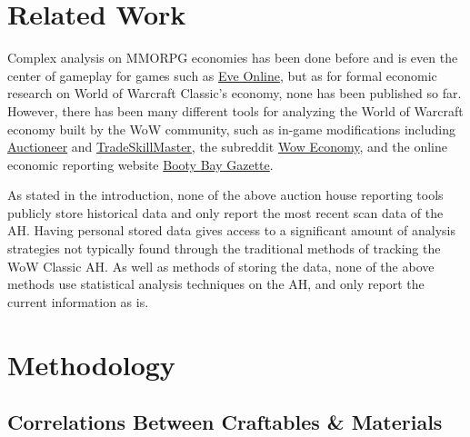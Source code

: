 \documentclass[sigconf]{acmart}
\begin{document}
\section{Related Work}Complex analysis on MMORPG economies has been done before and is even the center of gameplay for games such as \href{https://www.eveonline.com/article/prg4uv/monthly-economic-report-april-2019}{Eve Online}, but as for formal economic research on World of Warcraft Classic’s economy, none has been published so far. However, there has been many different tools for analyzing the World of Warcraft economy built by the WoW community, such as in-game modifications including \href{https://www.curseforge.com/wow/addons/auctioneer}{Auctioneer} and \href{https://www.tradeskillmaster.com/}{TradeSkillMaster}, the subreddit \href{https://www.reddit.com/r/woweconomy/}{Wow Economy}, and the online economic reporting website \href{https://www.reddit.com/r/woweconomy/}{Booty Bay Gazette}.

As stated in the introduction, none of the above auction house reporting tools publicly store historical data and only report the most recent scan data of the AH. Having personal stored data gives access to a significant amount of analysis strategies not typically found through the traditional methods of tracking the WoW Classic AH. As well as methods of storing the data, none of the above methods use statistical analysis techniques on the AH, and only report the current information as is. 

\section{Methodology}

\subsection{Correlations Between Craftables \& Materials}
\end{document}
